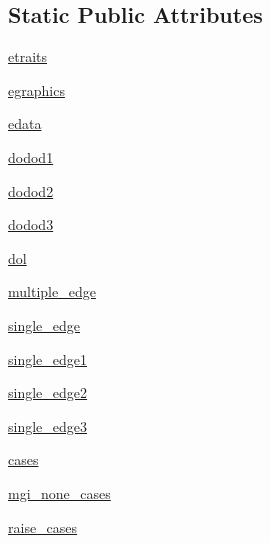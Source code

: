 \subsection*{Static Public Attributes}
\begin{DoxyCompactItemize}
\item 
\hyperlink{classnetworkx_1_1classes_1_1tests_1_1test__multigraph_1_1TestMultiGraph_a6a06d8fc9dc5984fc3e8a63b8d66a604}{etraits}
\item 
\hyperlink{classnetworkx_1_1classes_1_1tests_1_1test__multigraph_1_1TestMultiGraph_a706c464d9fa394122e3fbc5b8afb2148}{egraphics}
\item 
\hyperlink{classnetworkx_1_1classes_1_1tests_1_1test__multigraph_1_1TestMultiGraph_aa1eb9cd75820a55998997a8adf27f27f}{edata}
\item 
\hyperlink{classnetworkx_1_1classes_1_1tests_1_1test__multigraph_1_1TestMultiGraph_a2e44b5c7dcad248ea5c0ae50aa62a749}{dodod1}
\item 
\hyperlink{classnetworkx_1_1classes_1_1tests_1_1test__multigraph_1_1TestMultiGraph_a8746b40b5d82863de7c8e20d554c8a92}{dodod2}
\item 
\hyperlink{classnetworkx_1_1classes_1_1tests_1_1test__multigraph_1_1TestMultiGraph_a9b66b30a9ffae75829757a0c8c2c157f}{dodod3}
\item 
\hyperlink{classnetworkx_1_1classes_1_1tests_1_1test__multigraph_1_1TestMultiGraph_a7774e023bfb9e2b3c05e8ee971ff0606}{dol}
\item 
\hyperlink{classnetworkx_1_1classes_1_1tests_1_1test__multigraph_1_1TestMultiGraph_af0d10b09eabde2151d5683a166104f21}{multiple\+\_\+edge}
\item 
\hyperlink{classnetworkx_1_1classes_1_1tests_1_1test__multigraph_1_1TestMultiGraph_a8db73d0ab832d275debe1beb9b2e311f}{single\+\_\+edge}
\item 
\hyperlink{classnetworkx_1_1classes_1_1tests_1_1test__multigraph_1_1TestMultiGraph_ac1b14e8e99bf0000e98f719a3ac79e72}{single\+\_\+edge1}
\item 
\hyperlink{classnetworkx_1_1classes_1_1tests_1_1test__multigraph_1_1TestMultiGraph_a3f191a2d53b1f0b9708a24f778416a97}{single\+\_\+edge2}
\item 
\hyperlink{classnetworkx_1_1classes_1_1tests_1_1test__multigraph_1_1TestMultiGraph_aa36c0dc9db13747f0513308ae417430c}{single\+\_\+edge3}
\item 
\hyperlink{classnetworkx_1_1classes_1_1tests_1_1test__multigraph_1_1TestMultiGraph_a9b57c06fdfa0d964d7ea741d5ddf9f95}{cases}
\item 
\hyperlink{classnetworkx_1_1classes_1_1tests_1_1test__multigraph_1_1TestMultiGraph_a0917d8896b49210222163c0faaf6a3af}{mgi\+\_\+none\+\_\+cases}
\item 
\hyperlink{classnetworkx_1_1classes_1_1tests_1_1test__multigraph_1_1TestMultiGraph_a289cdc51a8d4a6cab174e40a638e0511}{raise\+\_\+cases}
\end{DoxyCompactItemize}


